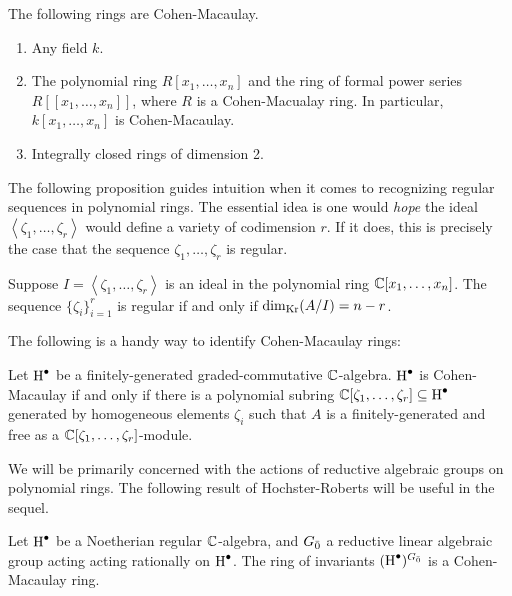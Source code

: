 \begin{example}
  The following rings are Cohen-Macaulay.
  \begin{enumerate}
  \item Any field $k$.
  \item The polynomial ring $R[x_1,\ldots,x_n]$ and the ring of formal power series $R[[x_1,\ldots,x_n]]$, where $R$ is a Cohen-Macualay ring. In particular, $k[x_1,\ldots,x_n]$ is Cohen-Macaulay.
  \item Integrally closed rings of dimension 2.
  \end{enumerate}
\end{example}

The following proposition guides intuition when it comes to recognizing regular sequences in polynomial rings. The essential idea is one would \emph{hope} the ideal $\left<\zeta_1,\ldots,\zeta_r\right>$ would define a variety of codimension $r$. If it does, this is precisely the case that the sequence $\zeta_1,\ldots,\zeta_r$ is regular.

\begin{proposition}[Macaulay]
  Suppose $I = \left<\zeta_1, \ldots , \zeta_r\right>$ is an ideal in the polynomial ring  $\mathbb{C}[x_1,\ldots,x_n]$. The sequence $\{\zeta_i\}_{i=1}^r$ is regular if and only if $\dim_{\operatorname{Kr}}(A/I) = n - r$.
\end{proposition}

The following is a handy way to identify Cohen-Macaulay rings:



\begin{proposition}
  Let $\operatorname{H}^\bullet$ be a finitely-generated graded-commutative $\mathbb{C}$-algebra. $\operatorname{H}^\bullet$ is Cohen-Macaulay if and only if there is a polynomial subring $\mathbb{C}[\zeta_1,\ldots,\zeta_r] \subseteq \operatorname{H}^\bullet$ generated by homogeneous elements $\zeta_i$ such that $A$ is a finitely-generated and free as a $\mathbb{C}[\zeta_1,\ldots,\zeta_r]$-module.
\end{proposition}

We will be primarily concerned with the actions of reductive algebraic groups on polynomial rings. The following result of Hochster-Roberts \cite{MR0347810} will be useful in the sequel.

\begin{proposition}
  Let $\operatorname{H}^\bullet$ be a Noetherian regular $\mathbb{C}$-algebra, and ${G}_{\bar{0}}$ a reductive linear algebraic group acting acting rationally on $\operatorname{H}^\bullet$. The ring of invariants $(\operatorname{H}^\bullet)^{{G}_{\bar{0}}}$ is a Cohen-Macaulay ring.
\end{proposition}

